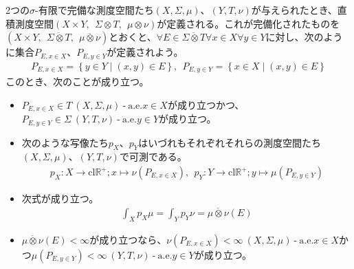 \documentclass[dvipdfmx]{jsarticle}
\begin{document}
\begin{thm}\label{4.6.4.7}
2つの$\sigma$-有限で完備な測度空間たち$(X,\varSigma,\mu)$、$(Y,T,\nu)$が与えられたとき、直積測度空間$(X \times Y,\ \ \varSigma \otimes T,\ \ \mu \otimes \nu)$が定義される。これが完備化されたものを$\left( X \times Y,\ \ \overline{\varSigma \otimes T},\ \ \overline{\mu \otimes \nu} \right)$とおくと、$\forall E \in \overline{\varSigma \otimes T}\forall x \in X\forall y \in Y$に対し、次のように集合$P_{E,x \in X}$、$P_{E,y \in Y}$が定義されよう。
\begin{align*}
P_{E,x \in X} = \left\{ y \in Y \middle| (x,y) \in E \right\},\ \ P_{E,y \in Y} = \left\{ x \in X \middle| (x,y) \in E \right\}
\end{align*}
このとき、次のことが成り立つ。
\begin{itemize}
\item
  $P_{E,x \in X} \in T\ (X,\varSigma,\mu) \ \text{-} \ \mathrm{a.e.}x \in X$が成り立つかつ、$P_{E,y \in Y} \in \varSigma\ (Y,T,\nu) \ \text{-} \ \mathrm{a.e.}y \in Y$が成り立つ。
\item
  次のような写像たち$p_{X}$、$p_{Y}$はいづれもそれぞれそれらの測度空間たち$(X,\varSigma,\mu)$、$(Y,T,\nu)$で可測である。
\begin{align*}
p_{X}:X \rightarrow \mathrm{cl}\mathbb{R}^{+};x \mapsto \nu\left( P_{E,x \in X} \right),\ \ p_{Y}:Y \rightarrow \mathrm{cl}\mathbb{R}^{+};y \mapsto \mu\left( P_{E,y \in Y} \right)
\end{align*}
\item
  次式が成り立つ。
\begin{align*}
\int_{X} {p_{X}\mu} = \int_{Y} {p_{Y}\nu} = \overline{\mu \otimes \nu}(E)
\end{align*}
\item
  $\overline{\mu \otimes \nu}(E) < \infty$が成り立つなら、$\nu\left( P_{E,x \in X} \right) < \infty\ (X,\varSigma,\mu) \ \text{-} \ \mathrm{a.e.}x \in X$かつ$\mu\left( P_{E,y \in Y} \right) < \infty\ (Y,T,\nu) \ \text{-} \ \mathrm{a.e.}y \in Y$が成り立つ。
\end{itemize}
\end{thm}
\end{document}
